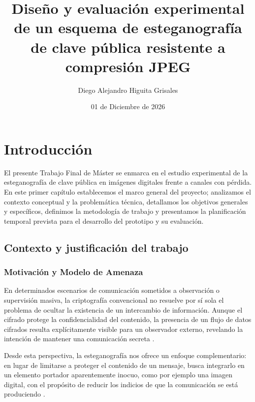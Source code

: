 \documentclass[IB]{TFUOC}%
\title{Diseño y evaluación experimental de un esquema de esteganografía de clave pública resistente a compresión JPEG}
\author{Diego Alejandro Higuita Grisales}
\date{01 de Diciembre de 2026}
\begin{document}
\estructura

\tableofcontents
\newpage
\begingroup
\let\clearpage\relax
\listoffigures
\listoftables
\endgroup




\chapter{Introducción}

El presente Trabajo Final de Máster se enmarca en el estudio experimental de la esteganografía de clave pública en imágenes digitales frente a canales con pérdida. En este primer capítulo establecemos el marco general del proyecto; analizamos el contexto conceptual y la problemática técnica, detallamos los objetivos generales y específicos, definimos la metodología de trabajo y presentamos la planificación temporal prevista para el desarrollo del prototipo y su evaluación.

\section{Contexto y justificación del trabajo}
\label{sec:contexto_justificacion}

\subsection{Motivación y Modelo de Amenaza}
En determinados escenarios de comunicación sometidos a observación o supervisión masiva, la criptografía convencional no resuelve por sí sola el problema de ocultar la existencia de un intercambio de información. Aunque el cifrado protege la confidencialidad del contenido, la presencia de un flujo de datos cifrados resulta explícitamente visible para un observador externo, revelando la intención de mantener una comunicación secreta \cite{5,8}.

Desde esta perspectiva, la esteganografía nos ofrece un enfoque complementario: en lugar de limitarse a proteger el contenido de un mensaje, busca integrarlo en un elemento portador aparentemente inocuo, como por ejemplo una imagen digital, con el propósito de reducir los indicios de que la comunicación se está produciendo \cite{5}. 
\end{document}
